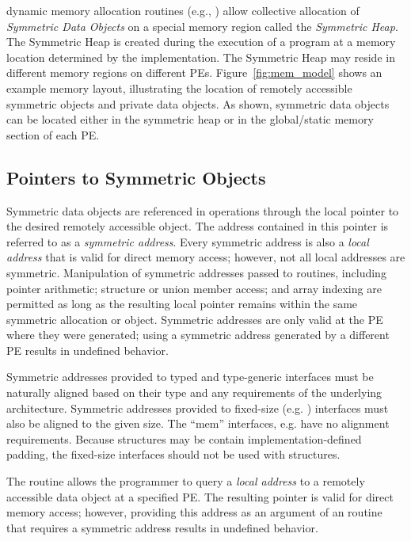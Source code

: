\openshmem dynamic memory allocation routines (e.g.,
) allow collective allocation of \emph{Symmetric Data
Objects} on a special memory region called the \emph{Symmetric Heap}. The
Symmetric Heap is created during the execution of a program at a memory location
determined by the implementation. The Symmetric Heap may reside in different
memory regions on different \acp{PE}.
Figure~\ref{fig:mem_model} shows an example \openshmem
memory layout, illustrating the location of remotely accessible symmetric
objects and private data objects.  As shown, symmetric data objects can be
located either in the symmetric heap or in the global/static memory section of
each \ac{PE}.

\subsection{Pointers to Symmetric Objects}

Symmetric data objects are referenced in \openshmem operations through the
local pointer to the desired remotely accessible object.  The address contained
in this pointer is referred to as a {\em symmetric address}.  Every symmetric
address is also a {\em local address} that is valid for direct memory access;
however, not all local addresses are symmetric.  Manipulation of symmetric
addresses passed to \openshmem routines, including pointer arithmetic;
structure or union member access; and array indexing are permitted as long as
the resulting local pointer remains within the same symmetric allocation or
object.  Symmetric addresses are only valid at the \ac{PE} where they were
generated; using a symmetric address generated by a different \ac{PE} results
in undefined behavior.

Symmetric addresses provided to typed and type-generic \openshmem interfaces
must be naturally aligned based on their type and any requirements of the
underlying architecture.  Symmetric addresses provided to fixed-size (e.g.
) \openshmem interfaces must also be aligned to the given
size.  The ``mem'' interfaces, e.g.  have no alignment
requirements.  Because \CorCpp{} structures may be contain
implementation-defined padding, the fixed-size interfaces should not be used
with \CorCpp{} structures.

The  routine allows the programmer to query a {\em local
address} to a remotely accessible data object at a specified \ac{PE}.  The
resulting pointer is valid for direct memory access; however, providing this
address as an argument of an \openshmem routine that requires a symmetric
address results in undefined behavior.

